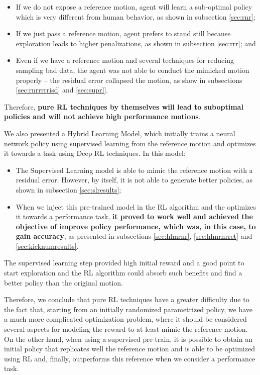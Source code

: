 \begin{itemize}
	\item If we do not expose a reference motion, agent will learn a sub-optimal policy which is very different from human behavior, as shown in subsection \ref{sec:rnr};
	\item If we just pass a reference motion, agent prefers to stand still because exploration leads to higher penalizations, as shown in subsection \ref{sec:rrr}; and
	\item Even if we have a reference motion and several techniques for reducing sampling bad data, the agent was not able to conduct the mimicked motion properly -- the residual error collapsed the motion, as show in subsections \ref{sec:rnrrrrrisd} and \ref{sec:suprl}.
\end{itemize}

Therefore, \textbf{pure RL techniques by themselves will lead to suboptimal policies and will not achieve high performance motions}.

We also presented a Hybrid Learning Model, which initially trains a neural network policy using supervised learning from the reference motion and optimizes it towards a task using Deep RL techniques. In this model:

\begin{itemize}
	\item The Supervised Learning model is able to mimic the reference motion with a residual error. However, by itself, it is not able to generate better policies, as shown in subsection \ref{sec:slresults};
	\item When we inject this pre-trained model in the RL algorithm and the optimizes it towards a performance task, \textbf{it proved to work well and achieved the objective of improve policy performance, which was, in this case, to gain accuracy}, as presented in subsections \ref{sec:hlmrnr}, \ref{sec:hlmrnrret} and \ref{sec:kicknumresults}.
\end{itemize}

 The supervised learning step provided high initial reward and a good point to start exploration and the RL algorithm could absorb such benefits and find a better policy than the original motion.

Therefore, we conclude that pure RL techniques have a greater difficulty due to the fact that, starting from an initially randomized parametrized policy, we have a much more complicated optimization problem, where it should be considered
several aspects for modeling the reward to at least mimic the reference motion. On the other hand, when using a supervised pre-train, it is possible to obtain an initial policy that replicates well the reference motion and is able to be optimized using RL and, finally, outperforms this reference when we consider a performance task.

